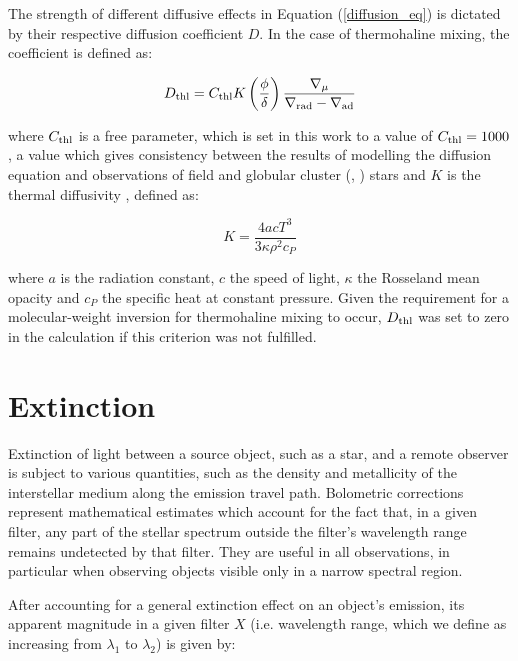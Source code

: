 \documentclass[12pt, a4paper]{report}
\begin{document}
The strength of different diffusive effects in Equation (\ref{diffusion_eq}) is dictated by their respective diffusion coefficient $D$. In the case of thermohaline mixing, the coefficient is defined \citep{2010A&A...521A...9C} as:

\begin{equation}
D_{\textnormal{thl}} = C_{\textnormal{thl}} K \left( \frac{\phi}{\delta} \right) \frac{\nabla _{\mu}}{\nabla _{\textnormal{rad}} - \nabla _{\textnormal{ad}}}
\label{Dthl_def}
\end{equation}

where $C_{\textnormal{thl}}$ is a free parameter, which is set in this work to a value of $C_{\textnormal{thl}} = 1000$, a value which gives consistency between the results of modelling the diffusion equation and observations of field \citep{2007A&A...467L..15C} and globular cluster (\cite{2011ApJ...728...79A}, \cite{2012ApJ...749..128A}) stars and $K$ is the thermal diffusivity \citep{2017RSOS....470192S}, defined as:

\begin{equation}
K = \frac{4acT^{3}}{3\kappa\rho ^{2}c_{P}}
\label{diffusivity_def}
\end{equation}

where $a$ is the radiation constant, $c$ the speed of light, $\kappa$ the Rosseland mean opacity and $c_{P}$ the specific heat at constant pressure. Given the requirement for a molecular-weight inversion for thermohaline mixing to occur, $D_{\textnormal{thl}}$ was set to zero in the calculation if this criterion was not fulfilled.

\section{Extinction}
Extinction of light between a source object, such as a star, and a remote observer is subject to various quantities, such as the density and metallicity of the interstellar medium along the emission travel path. Bolometric corrections represent mathematical estimates which account for the fact that, in a given filter, any part of the stellar spectrum outside the filter's wavelength range remains undetected by that filter. They are useful in all observations, in particular when observing objects visible only in a narrow spectral region.

After accounting for a general extinction effect on an object's emission, its apparent magnitude in a given filter $X$ (i.e. wavelength range, which we define as increasing from $\lambda _{1}$ to $\lambda _{2}$) is given by:
\end{document}
